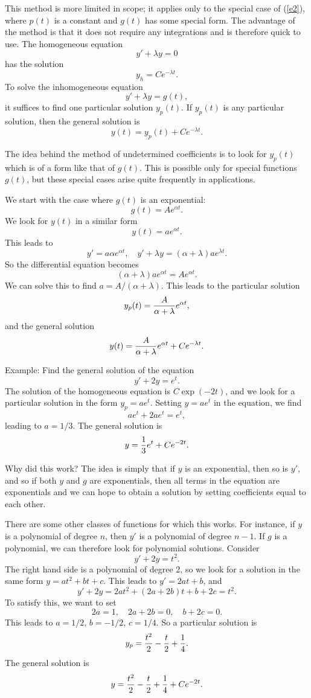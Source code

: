 This method is more limited in scope; it applies only to the special case
of (\ref{e2}), where $p(t)$ is a constant and $g(t)$ has some special form.
The advantage of the method is that it does not require any integrations and
is therefore quick to use. The homogeneous equation
$$y'+\lambda y=0$$
has the solution
$$y_h=Ce^{-\lambda t}.$$
To solve the inhomogeneous equation
$$y'+\lambda y=g(t),$$
it suffices to find one particular solution $y_p(t)$. If $y_p(t)$ is any
particular solution, then the general solution is
$$y(t)=y_p(t)+Ce^{-\lambda t}.$$

The idea behind the method of undetermined coefficients is to look for
$y_p(t)$ which is of a form like that of $g(t)$. This is possible only for
special functions $g(t)$, but these special cases arise quite frequently in
applications.

We start with the case where $g(t)$ is an exponential:
$$g(t)=Ae^{\alpha t}.$$
We look for $y(t)$ in a similar form
$$y(t)=ae^{\alpha t}.$$
This leads to
$$y'=a\alpha e^{\alpha t},\quad y'+\lambda y=(\alpha+\lambda)ae^{\lambda t}.$$
So the differential equation becomes
$$(\alpha+\lambda)ae^{\alpha t}=Ae^{\alpha t}.$$
We can solve this to find $a=A/(\alpha+\lambda)$. This leads to the particular
solution
$$y_p(t)={A\over \alpha+\lambda}e^{\alpha t},$$
and the general solution
\begin{equation}
y(t)={A\over \alpha+\lambda}e^{\alpha t}+Ce^{-\lambda t}.\label{e3}
\end{equation}

Example: Find the general solution of the equation
$$y'+2y=e^t.$$
The solution of the homogeneous equation is $C\exp(-2t)$, and we look
for a particular solution in the form $y_p=ae^t$. Setting $y=ae^t$ in
the equation, we find
$$ae^t+2ae^t=e^t,$$
leading to $a=1/3$. The general solution is
$$y={1\over 3}e^t+Ce^{-2t}.$$

Why did this work? The idea is simply that if $y$ is an exponential, then so
is $y'$, and so if both $y$ and $g$ are exponentials, then all terms in
the equation are exponentials and we can hope to obtain a solution by setting
coefficients equal to each other.

There are some other classes of functions for which this works. For instance,
if $y$ is a polynomial of degree $n$, then $y'$ is a polynomial of degree
$n-1$. If $g$ is a polynomial, we can therefore look for polynomial solutions.
Consider
$$y'+2y=t^2.$$
The right hand side is a polynomial of degree 2, so we look for a solution
in the same form $y=at^2+bt+c$. This leads to $y'=2at+b$, and
$$y'+2y=2at^2+(2a+2b)t+b+2c=t^2.$$
To satisfy this, we want to set
$$2a=1,\quad 2a+2b=0,\quad b+2c=0.$$
This leads to $a=1/2$, $b=-1/2$, $c=1/4$.
So a particular solution is
$$y_p={t^2\over 2}-{t\over 2}+{1\over 4}.$$
The general solution is
$$y={t^2\over 2}-{t\over 2}+{1\over 4}+Ce^{-2t}.$$

